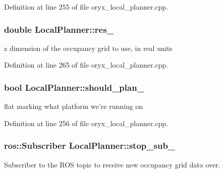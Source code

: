 \-Definition at line 255 of file oryx\-\_\-local\-\_\-planner.\-cpp.

\subsubsection[{res\-\_\-}]{\setlength{\rightskip}{0pt plus 5cm}double {\bf \-Local\-Planner\-::res\-\_\-}\hspace{0.3cm}{\ttfamily  [private]}}\label{classLocalPlanner_a8077cef3936c2691936388ee28f0ff9d}


z dimension of the occupancy grid to use, in real units 



\-Definition at line 265 of file oryx\-\_\-local\-\_\-planner.\-cpp.

\subsubsection[{should\-\_\-plan\-\_\-}]{\setlength{\rightskip}{0pt plus 5cm}bool {\bf \-Local\-Planner\-::should\-\_\-plan\-\_\-}\hspace{0.3cm}{\ttfamily  [private]}}\label{classLocalPlanner_aedc2482876eaeb5f9c33f24f90fa827d}


flat marking what platform we're running on 



\-Definition at line 256 of file oryx\-\_\-local\-\_\-planner.\-cpp.

\subsubsection[{stop\-\_\-sub\-\_\-}]{\setlength{\rightskip}{0pt plus 5cm}ros\-::\-Subscriber {\bf \-Local\-Planner\-::stop\-\_\-sub\-\_\-}\hspace{0.3cm}{\ttfamily  [private]}}\label{classLocalPlanner_ac5be4b2d7e3ba97acd1baad8378e5b84}


\-Subscriber to the \-R\-O\-S topic to receive new occupancy grid data over. 




